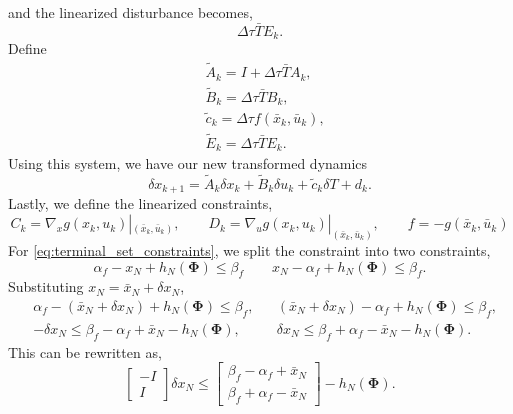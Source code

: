 \documentclass{article}
\begin{document}
and the linearized disturbance becomes,
\begin{equation}
    \Delta \tau \bar{T} E_k.
\end{equation}
Define
\begin{subequations}
    \begin{align}
        & \tilde{A}_k = I + \Delta \tau \bar{T} A_k, \\
        & \tilde{B}_k = \Delta \tau \bar{T} B_k, \\
        & \tilde{c}_k = \Delta \tau f(\bar{x}_k, \bar{u}_k), \\
        & \tilde {E}_k = \Delta \tau \bar{T} E_k. 
    \end{align}
\end{subequations}
Using this system, we have our new transformed dynamics
\begin{equation}
    \delta x_{k+1} = \tilde{A}_k \delta x_k + \tilde{B}_k \delta u_k + \tilde{c}_k \delta T + d_k.
\end{equation}
Lastly, we define the linearized constraints,
\begin{equation}
    C_k = \nabla_x g(x_k, u_k) |_{(\bar{x}_k, \bar{u}_k)}, \qquad D_k = \nabla_u g(x_k, u_k)|_{(\bar{x}_k, \bar{u}_k)}, \qquad f = -g(\bar{x}_k, \bar{u}_k)
\end{equation}
For \eqref{eq:terminal_set_constraints}, we split the constraint into two constraints,
\begin{equation}
    \alpha_f - x_N + h_N(\mathbf{\Phi}) \leq \beta_f \qquad x_N - \alpha_f + h_N(\mathbf{\Phi}) \leq \beta_f.
\end{equation}
Substituting $x_N = \bar{x}_N + \delta x_N$,
\begin{equation}
    \begin{aligned}
        & \alpha_f - (\bar{x}_N + \delta x_N) + h_N(\mathbf{\Phi}) \leq \beta_f, && (\bar{x}_N + \delta x_N) - \alpha_f + h_N(\mathbf{\Phi}) \leq \beta_f, \\
        & - \delta x_N \leq \beta_f - \alpha_f + \bar x_N - h_N(\mathbf{\Phi}), && \delta x_N \leq \beta_f + \alpha_f - \bar{x}_N - h_N(\mathbf{\Phi}).
    \end{aligned}
\end{equation}
This can be rewritten as,
\begin{equation}
    \begin{bmatrix}
        -I \\
        I
    \end{bmatrix}
    \delta x_N
    \leq
    \begin{bmatrix}
        \beta_f - \alpha_f + \bar x_N \\
        \beta_f + \alpha_f - \bar x_N
    \end{bmatrix}
    -
    h_N(\mathbf{\Phi}).
\end{equation}
\end{document}
